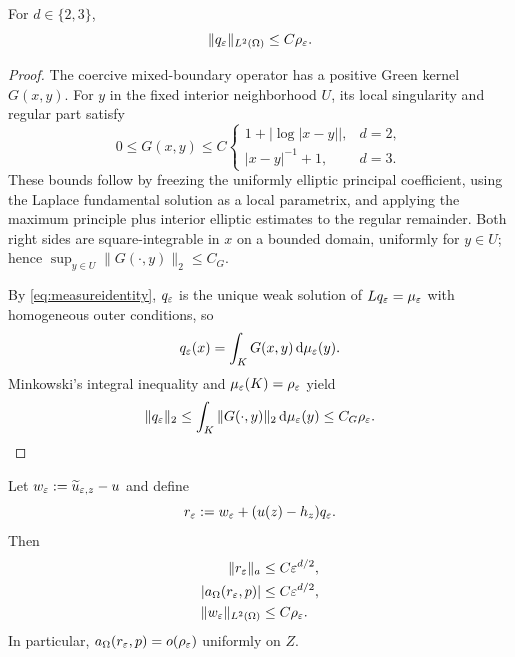 \begin{lemma}
\label{lem:qLtwo}
For $d\in\{2,3\}$,
\begin{equation}
 \|q_\varepsilon\|_{L^2(\Omega)}\le C\rho_\varepsilon.
 \label{eq:qLtwo}
\end{equation}
\end{lemma}

\begin{proof}
The coercive mixed-boundary operator has a positive Green kernel $G(x,y)$.
For $y$ in the fixed interior neighborhood $U$, its local singularity and
regular part satisfy
\begin{equation}
 0\le G(x,y)\le C
 \begin{cases}
 1+|\log|x-y||,&d=2,\\
 |x-y|^{-1}+1,&d=3.
 \end{cases}
 \label{eq:greenbound}
\end{equation}
These bounds follow by freezing the uniformly elliptic principal coefficient,
using the Laplace fundamental solution as a local parametrix, and applying the
maximum principle plus interior elliptic estimates to the regular remainder.
Both right sides are square-integrable in $x$ on a bounded domain, uniformly
for $y\in U$; hence
$\sup_{y\in U}\|G(\cdot,y)\|_2\le C_G$.

By \cref{eq:measureidentity}, $q_\varepsilon$ is the unique weak solution of
$Lq_\varepsilon=\mu_\varepsilon$ with homogeneous outer conditions, so
\begin{equation}
 q_\varepsilon(x)=\int_KG(x,y)\,\mathrm d\mu_\varepsilon(y).
\end{equation}
Minkowski's integral inequality and
$\mu_\varepsilon(K)=\rho_\varepsilon$ yield
\begin{equation}
 \|q_\varepsilon\|_2
 \le\int_K\|G(\cdot,y)\|_2\,\mathrm d\mu_\varepsilon(y)
 \le C_G\rho_\varepsilon.
\end{equation}
\end{proof}

\begin{lemma}
\label{lem:statecorrector}
Let $w_\varepsilon:=\widetilde u_{\varepsilon,z}-u$ and define
\begin{equation}
 r_\varepsilon:=w_\varepsilon+(u(z)-h_z)q_\varepsilon.
 \label{eq:correctordefinition}
\end{equation}
Then
\begin{align}
 \|r_\varepsilon\|_a&\le C\varepsilon^{d/2},
 \label{eq:correctorenergy}\\
 |a_\Omega(r_\varepsilon,p)|&\le C\varepsilon^{d/2},
 \label{eq:correctoradjoint}\\
 \|w_\varepsilon\|_{L^2(\Omega)}&\le C\rho_\varepsilon.
 \label{eq:stateLtwo}
\end{align}
In particular, $a_\Omega(r_\varepsilon,p)=o(\rho_\varepsilon)$ uniformly on $Z$.
\end{lemma}

